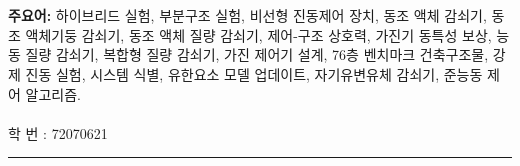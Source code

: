 \\
\\
{\large\textbf{주요어:}}
하이브리드 실험, 부분구조 실험, 비선형 진동제어 장치, 동조 액체 감쇠기, 동조 액체기둥 감쇠기, 동조 액체 질량 감쇠기, 제어-구조 상호력, 가진기 동특성 보상, 능동 질량 감쇠기, 복합형 질량 감쇠기, 가진 제어기 설계, 76층 벤치마크 건축구조물, 강제 진동 실험, 시스템 식별, 유한요소 모델 업데이트, 자기유변유체 감쇠기, 준능동 제어 알고리즘.
\\
\\
학 번 : 72070621\\
\noindent\rule[2pt]{\textwidth}{0.5pt}
